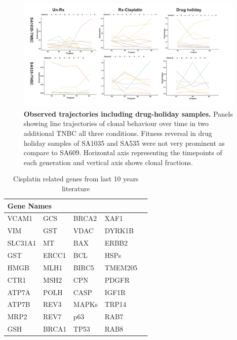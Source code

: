 \begin{figure}
\centering
\includegraphics[width=\textwidth]{Figures/drugholidaysamples.pdf}
	
\caption[TNBC-SA609 PDX reproducible clonal dynamics with and without treatment]
	{\small
\textbf{Observed trajectories including drug-holiday samples.}
Panels showing line trajectories of clonal behaviour over time in two additional TNBC all three conditions. Fitness reversal in drug holiday samples of SA1035 and SA535 were not very prominent as compare to SA609. Horizontal axis representing the timepoints of each generation and vertical axis shows clonal fractions.
	}
	\label{fig:drugholidaysamples}
\end{figure}




 \begin{table}[htbp]
   \centering
   \caption{Cisplatin related genes from last 10 years literature}
     \begin{tabular}{|l|l|l|l|r}
     
     \hline
     \multicolumn{4}{|l|}{Gene Names}  \\
     \hline
     
     VCAM1  & GCS    & BRCA2  & XAF1    \\
     VIM    & GST    & VDAC   & DYRK1B  \\
     SLC31A1 & MT     & BAX    & ERBB2 \\
     GST    & ERCC1  & BCL    & HSPs   \\
     HMGB   & MLH1   & BIRC5  & TMEM205 \\
     CTR1   & MSH2   & CPN    & PDGFR \\
     ATP7A  & POLH   & CASP   & IGF1R  \\
     ATP7B  & REV3   & MAPKs  & TRP14  \\
     MRP2   & REV7   & p63    & RAB7   \\
     GSH    & BRCA1  & TP53   & RAB8   \\
     \hline
     \end{tabular}%
   \label{tab:Cisplatinrelatedgenes}%
 \end{table}
 
